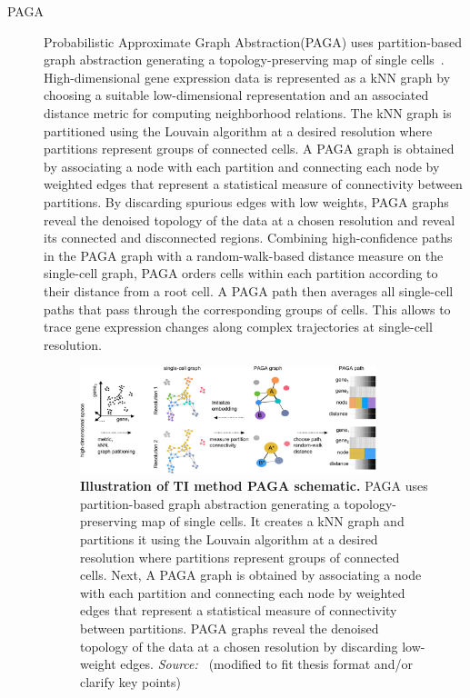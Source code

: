\begin{description}
    \item[PAGA]
    Probabilistic Approximate Graph Abstraction(PAGA) uses partition-based graph abstraction generating a topology-preserving map of single cells~\citep{wolf2019paga}. High-dimensional gene expression data is represented as a kNN graph by choosing a suitable low-dimensional representation and an associated distance metric for computing neighborhood relations. The kNN graph is partitioned using the Louvain algorithm at a desired resolution where partitions represent groups of connected cells. A PAGA graph is obtained by associating a node with each partition and connecting each node by weighted edges that represent a statistical measure of connectivity between partitions. By discarding spurious edges with low weights, PAGA graphs reveal the denoised topology of the data at a chosen resolution and reveal its connected and disconnected regions. Combining high-confidence paths in the PAGA graph with a random-walk-based distance measure on the single-cell graph, PAGA orders cells within each partition according to their distance from a root cell. A PAGA path then averages all single-cell paths that pass through the corresponding groups of cells. This allows to trace gene expression changes along complex trajectories at single-cell resolution.
    \begin{figure}[ht!]
    	\centering
    	\includegraphics[width=0.85\textwidth]{TI_Alg_PAGA/fig}
    	\vspace{0.1cm}
    	\caption[Illustration of TI method PAGA schematic.]{\textbf{Illustration of TI method PAGA schematic.}
    	PAGA uses partition-based graph abstraction generating a topology-preserving map of single cells. It creates a kNN graph and partitions it using the Louvain algorithm at a desired resolution where partitions represent groups of connected cells. Next, A PAGA graph is obtained by associating a node with each partition and connecting each node by weighted edges that represent a statistical measure of connectivity between partitions. PAGA graphs reveal the denoised topology of the data at a chosen resolution by discarding low-weight edges. \emph{Source:~\cite{wolf2019paga}} (modified to fit thesis format and/or clarify key points)
    	}
    	\label{fig:TI_Alg_PAGA}
    \end{figure}


\end{description}

